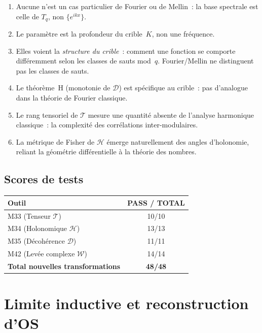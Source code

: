 \documentclass[12pt,a4paper]{article}
\begin{document}
\begin{enumerate}[nosep]
\item Aucune n'est un cas particulier de Fourier ou de Mellin~: la
  base spectrale est celle de $T_q$, non $\{e^{ikx}\}$.
\item Le paramètre est la profondeur du crible~$K$, non une
  fréquence.
\item Elles voient la \emph{structure du crible}~: comment une
  fonction se comporte différemment selon les classes de sauts
  mod~$q$. Fourier/Mellin ne distinguent pas les classes de sauts.
\item Le théorème~H (monotonie de $\mathcal{D}$) est spécifique au
  crible~: pas d'analogue dans la théorie de Fourier classique.
\item Le rang tensoriel de $\mathcal{T}$ mesure une quantité absente
  de l'analyse harmonique classique~: la complexité des corrélations
  inter-modulaires.
\item La métrique de Fisher de $\mathcal{H}$ émerge naturellement
  des angles d'holonomie, reliant la géométrie différentielle à la
  théorie des nombres.
\end{enumerate}


\subsection*{Scores de tests}

\begin{center}
\begin{tabular}{lc}
\toprule
\textbf{Outil} & \textbf{PASS / TOTAL} \\
\midrule
M33 (Tenseur $\mathcal{T}$) & 10/10 \\
M34 (Holonomique $\mathcal{H}$) & 13/13 \\
M35 (Décohérence $\mathcal{D}$) & 11/11 \\
M42 (Levée complexe $\mathcal{W}$) & 14/14 \\
\midrule
\textbf{Total nouvelles transformations} & \textbf{48/48} \\
\bottomrule
\end{tabular}
\end{center}


\newpage

\section{Limite inductive et reconstruction d'OS}
\label{app:os_limit}
\end{document}
